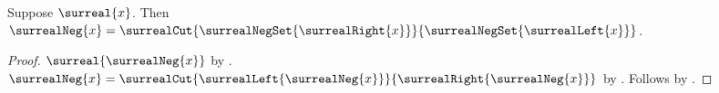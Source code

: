 \begin{theorem}\label{surreal_negation_cut_equation}
    Suppose $\surreal{x}$.
    Then $\surrealNeg{x}=
        \surrealCut{\surrealNegSet{\surrealRight{x}}}
            {\surrealNegSet{\surrealLeft{x}}}$.
\end{theorem}
\begin{proof}
    $\surreal{\surrealNeg{x}}$
        by .
    $\surrealNeg{x}=\surrealCut
        {\surrealLeft{\surrealNeg{x}}}
        {\surrealRight{\surrealNeg{x}}}$
        by .
    Follows by .
\end{proof}
